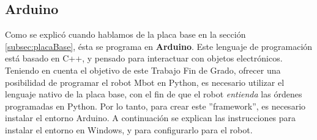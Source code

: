 \subsection{Arduino}\label{subsec:arduino}
Como se explicó cuando hablamos de la placa base en la sección \ref{subsec:placaBase}, ésta se programa en \textbf{Arduino}. Este lenguaje de programación está basado en C++, y pensado para interactuar con objetos electrónicos. \\
Teniendo en cuenta el objetivo de este Trabajo Fin de Grado, ofrecer una posibilidad de programar el robot Mbot en Python, es necesario utilizar el lenguaje nativo de la placa base, con el fin de que el robot \textit{entienda} las órdenes programadas en Python. Por lo tanto, para crear este ''framework'', es necesario instalar el entorno Arduino. A continuación se explican las instrucciones para instalar el entorno en Windows, y para configurarlo para el robot.
